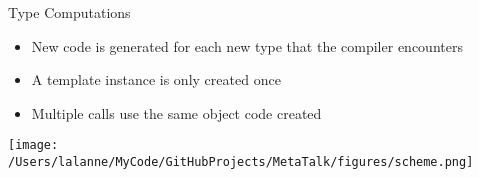 \begin{frame}[t]{Type Computations}
    \begin{itemize}
        \item New code is generated for each new type that the compiler encounters
        \item A template instance is only created once
        \item Multiple calls use the same object code created
    \end{itemize}
    \begin{center}
        \texttt{[image: /Users/lalanne/MyCode/GitHubProjects/MetaTalk/figures/scheme.png]}
    \end{center}
\end{frame}






